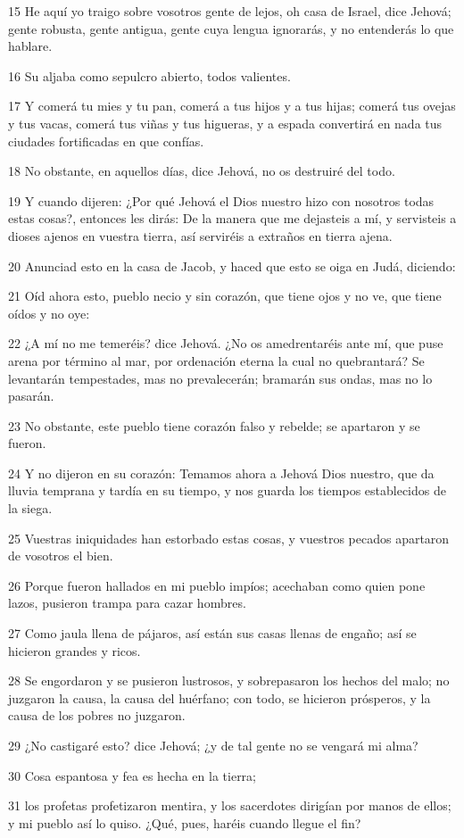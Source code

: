 \par 15 He aquí yo traigo sobre vosotros gente de lejos, oh casa de Israel, dice Jehová; gente robusta, gente antigua, gente cuya lengua ignorarás, y no entenderás lo que hablare.
\par 16 Su aljaba como sepulcro abierto, todos valientes.
\par 17 Y comerá tu mies y tu pan, comerá a tus hijos y a tus hijas; comerá tus ovejas y tus vacas, comerá tus viñas y tus higueras, y a espada convertirá en nada tus ciudades fortificadas en que confías.
\par 18 No obstante, en aquellos días, dice Jehová, no os destruiré del todo.
\par 19 Y cuando dijeren: ¿Por qué Jehová el Dios nuestro hizo con nosotros todas estas cosas?, entonces les dirás: De la manera que me dejasteis a mí, y servisteis a dioses ajenos en vuestra tierra, así serviréis a extraños en tierra ajena.
\par 20 Anunciad esto en la casa de Jacob, y haced que esto se oiga en Judá, diciendo:
\par 21 Oíd ahora esto, pueblo necio y sin corazón, que tiene ojos y no ve, que tiene oídos y no oye: 
\par 22 ¿A mí no me temeréis? dice Jehová. ¿No os amedrentaréis ante mí, que puse arena por término al mar, por ordenación eterna la cual no quebrantará? Se levantarán tempestades, mas no prevalecerán; bramarán sus ondas, mas no lo pasarán.
\par 23 No obstante, este pueblo tiene corazón falso y rebelde; se apartaron y se fueron.
\par 24 Y no dijeron en su corazón: Temamos ahora a Jehová Dios nuestro, que da lluvia temprana y tardía en su tiempo, y nos guarda los tiempos establecidos de la siega.
\par 25 Vuestras iniquidades han estorbado estas cosas, y vuestros pecados apartaron de vosotros el bien.
\par 26 Porque fueron hallados en mi pueblo impíos; acechaban como quien pone lazos, pusieron trampa para cazar hombres.
\par 27 Como jaula llena de pájaros, así están sus casas llenas de engaño; así se hicieron grandes y ricos.
\par 28 Se engordaron y se pusieron lustrosos, y sobrepasaron los hechos del malo; no juzgaron la causa, la causa del huérfano; con todo, se hicieron prósperos, y la causa de los pobres no juzgaron.
\par 29 ¿No castigaré esto? dice Jehová; ¿y de tal gente no se vengará mi alma?
\par 30 Cosa espantosa y fea es hecha en la tierra;
\par 31 los profetas profetizaron mentira, y los sacerdotes dirigían por manos de ellos; y mi pueblo así lo quiso. ¿Qué, pues, haréis cuando llegue el fin?

